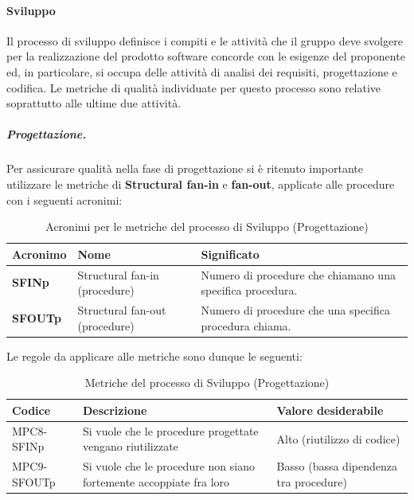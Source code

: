 \paragraph{Sviluppo}
Il processo di sviluppo definisce i compiti e le attività che il gruppo deve svolgere per la
realizzazione del prodotto software concorde con le esigenze del proponente ed, in particolare, si occupa delle attività di analisi dei requisiti, progettazione e codifica. Le metriche di qualità individuate per questo processo sono relative soprattutto alle ultime due attività.
\subparagraph{Progettazione.} Per assicurare qualità nella fase di progettazione si è ritenuto importante utilizzare le metriche di \textbf{Structural fan-in} e \textbf{fan-out}, applicate alle procedure con i seguenti acronimi:
\begin{table}[h!]
\centering
\def\arraystretch{1.5}
\begin{tabular}{ |m{2cm}|m{4cm}|m{8cm}| }
\hline
\rowcolor{lightgray!30}
\textbf{Acronimo} & \textbf{Nome} & \textbf{Significato}\\
\hline
\textbf{SFINp} & Structural fan-in (procedure) & Numero di procedure che chiamano una specifica procedura.\\
\hline
\textbf{SFOUTp} & Structural fan-out (procedure) & Numero di procedure che una specifica procedura chiama.\\
\hline
\end{tabular}
\caption{Acronimi per le metriche del processo di Sviluppo (Progettazione)}
\end{table}

\newpage
Le regole da applicare alle metriche sono dunque le seguenti:
\begin{table}[h!]
\centering
\def\arraystretch{1.5}
\begin{tabular}{ |>{\centering\arraybackslash}m{4cm}|>{\centering\arraybackslash}m{5.5cm}|>{\centering\arraybackslash}m{5cm}| }
\hline
\rowcolor{black}
\textbf{\color{white} Codice} & \textbf{\color{white} Descrizione} & \textbf{\color{white} Valore desiderabile}\\
\hline
MPC8-SFINp & Si vuole che le procedure progettate vengano riutilizzate & Alto (riutilizzo di codice) \\
\hline
MPC9-SFOUTp & Si vuole che le procedure non siano fortemente accoppiate fra loro & Basso (bassa dipendenza tra procedure) \\
\hline
\end{tabular}
\caption{Metriche del processo di Sviluppo (Progettazione)}
\end{table}



